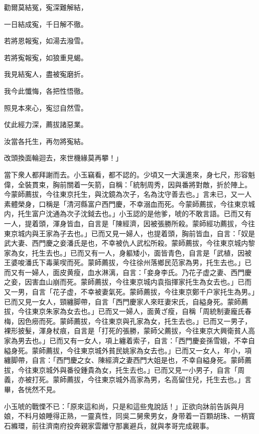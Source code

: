 \begin{myquote}
勸爾莫結冤，寃深難解結，

一日結成寃，千日解不徹。

若將恩報寃，如湯去潑雪。

若將寃報寃，如狼重見蝎。

我見結寃人，盡被寃磨折。

我今此懺悔，各把性悟徹。

照見本來心，寃愆自然雪。

仗此經力深，薦拔諸惡業。

汝當各托生，再勿將寃結。

改頭換面輪迴去，來世機緣莫再攀！」
\end{myquote}

當下衆人都拜謝而去。小玉竊看，都不認的。少頃又一大漢進來，身七尺，形容魁偉，全裝貫束，胸前關着一矢箭，自稱：「統制周秀，因與番將對敵，折於陣上。今蒙師薦拔，今往東京托生，與沈鏡為次子，名為沈守善去也。」言未已，又一人素體榮身，口稱是「清河縣富户西門慶，不幸溺血而死。今蒙師薦拔，今往東京城内，托生富户沈通為次子沈鉞去也。」小玉認的是他爹，唬的不敢言語。已而又有一人，提着頭，渾身皆血，自言是「陳經濟，因被張勝所殺。蒙師經功薦拔，今往東京城内與王家為子去也。」已而又見一婦人，也提着頭，胸前皆血，自言：「奴是武大妻、西門慶之妾潘氏是也，不幸被仇人武松所殺。蒙師薦拔，今往東京城内黎家為女，托生去也。」已而又有一人，身軀矮小，面皆青色，自言是「武植，因被王婆唆潘氏下毒薬喫而死。蒙師薦拔，今往徐州落鄉民范家為男，托生去也。」已而又有一婦人，面皮黄瘦，血水淋漓，自言：「妾身李氏。乃花子虚之妻、西門慶之妾，因害血山崩而死。蒙師薦拔，今往東京城内袁指揮家托生為女去也。」已而又一男，自言「花子虚，不幸被妻氣死。蒙師薦拔，今往東京鄭千户家托生為男。」已而又見一女人，頸纏脚帶，自言「西門慶家人來旺妻宋氏，自縊身死。蒙師薦拔，今往東京朱家為女去也。」已而又一婦人，面黄ざ瘦，自稱「周統制妻龐氏春梅，因色癆而死。蒙師薦拔，今往東京與孔家為女，托生去也。」已而又一男子，裸形披髮，渾身杖痕，自言是「打死的張勝，蒙師父薦拔，今往東京大興衛貧人高家為男去也。」已而又有一女人，項上纏着索子，自言：「西門慶妾孫雪娥，不幸自縊身死。蒙師薦拔，今往東京城外貧民姚家為女去也。」已而又一女人，年小，項纏脚帶，自言：「西門慶之女、陳經濟之妻西門大姐是也，不幸自縊身死。蒙師薦拔，今往東京城外與番役鍾貴為女，托生去也。」已而又見一小男子，自言「周義，亦被打死。蒙師薦拔，今往東京城外高家為男，名高留住兒，托生去也。」言畢，各恍然不見。

小玉唬的戰慄不已：「原來這和尚，只是和這些鬼說話！」正欲向牀前告訴與月娘，不料月娘睡得正熟，一靈真性，同吳二舅衆男女，身带着一百顆胡珠、一柄寳石縧環，前往濟南府投奔親家雲離守那裏避兵，就與孝哥完成親事。

